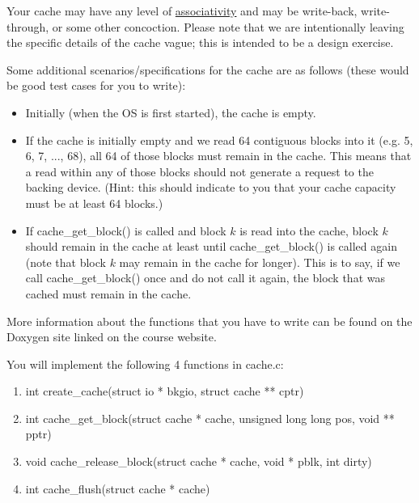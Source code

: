 \documentclass{article}
\begin{document}
	Your cache may have any level of \href{https://en.wikipedia.org/wiki/Cache_placement_policies}{associativity} and may be write-back, write-through, or some other concoction. 
	Please note that we are intentionally leaving the specific details of the cache vague; this is intended to be a design exercise.
		
	Some additional scenarios/specifications for the cache are as follows (these would be good test cases for you to write):
	\begin{itemize} 
		\item Initially (when the OS is first started), the cache is empty.
		\item If the cache is initially empty and we read 64 contiguous blocks into it (e.g. 5, 6, 7, ..., 68), 
			all 64 of those blocks must remain in the cache. This means that a read
			within any of those blocks should not generate a request to the backing device. (Hint: this should indicate to you that your cache capacity must be at least 64 blocks.)
		\item If {\fix cache\_get\_block()} is called and block $k$ is read into the cache, block $k$ should remain in the cache at least until {\fix cache\_get\_block()}
			is called again (note that block $k$ may remain in the cache for longer). 
			This is to say, if we call {\fix cache\_get\_block()} once and do not call it again, the block that was cached must remain in the cache.
		\end{itemize} 

	More information about the functions that you have to write can be found on the Doxygen site linked on the course website.

	You will implement the following 4 functions in {\fix cache.c}:
	\begin{enumerate}

		\item{{\fix int create\_cache(struct io * bkgio, struct cache ** cptr)}}
		
		\item{{\fix int cache\_get\_block(struct cache * cache, unsigned long long pos, void ** pptr)}}

		\item{{\fix void cache\_release\_block(struct cache * cache, void * pblk, int dirty)}}

		\item {{\fix int cache\_flush(struct cache * cache)}}

		\end{enumerate}
\end{document}
